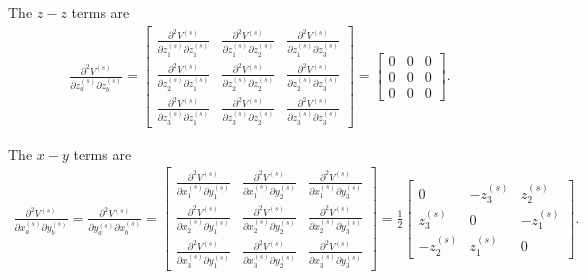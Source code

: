 The $z-z$ terms are
%
\begin{eqnarray}
\frac{\partial^2V^{(s)}}{\partial z_a^{(s)} \partial z_b^{(s)}} = 
\begin{bmatrix}
\frac{\partial^2V^{(s)}}{\partial z_1^{(s)} \partial z_1^{(s)}} & \frac{\partial^2V^{(s)}}{\partial z_1^{(s)} \partial z_2^{(s)}}  & \frac{\partial^2V^{(s)}}{\partial z_1^{(s)} \partial z_3^{(s)}} \\
%
\frac{\partial^2V^{(s)}}{\partial z_2^{(s)} \partial z_1^{(s)}} & \frac{\partial^2V^{(s)}}{\partial z_2^{(s)} \partial z_2^{(s)}}  & \frac{\partial^2V^{(s)}}{\partial z_2^{(s)} \partial z_3^{(s)}} \\
%
\frac{\partial^2V^{(s)}}{\partial z_3^{(s)} \partial z_1^{(s)}} & \frac{\partial^2V^{(s)}}{\partial z_3^{(s)} \partial z_2^{(s)}}  & \frac{\partial^2V^{(s)}}{\partial z_3^{(s)} \partial z_3^{(s)}}
\end{bmatrix} =
\begin{bmatrix}
0 & 0 & 0 \\
0 & 0 & 0 \\
0 & 0 & 0
\end{bmatrix}.
\end{eqnarray}
%

The $x-y$ terms are
%
\begin{eqnarray}
\frac{\partial^2V^{(s)}}{\partial x_a^{(s)} \partial y_b^{(s)}} = \frac{\partial^2V^{(s)}}{\partial y_a^{(s)} \partial x_b^{(s)}}=
\begin{bmatrix}
\frac{\partial^2V^{(s)}}{\partial x_1^{(s)} \partial y_1^{(s)}} & \frac{\partial^2V^{(s)}}{\partial x_1^{(s)} \partial y_2^{(s)}}  & \frac{\partial^2V^{(s)}}{\partial x_1^{(s)} \partial y_3^{(s)}} \\
%
\frac{\partial^2V^{(s)}}{\partial x_2^{(s)} \partial y_1^{(s)}} & \frac{\partial^2V^{(s)}}{\partial x_2^{(s)} \partial y_2^{(s)}}  & \frac{\partial^2V^{(s)}}{\partial x_2^{(s)} \partial y_3^{(s)}} \\
%
\frac{\partial^2V^{(s)}}{\partial x_3^{(s)} \partial y_1^{(s)}} & \frac{\partial^2V^{(s)}}{\partial x_3^{(s)} \partial y_2^{(s)}}  & \frac{\partial^2V^{(s)}}{\partial x_3^{(s)} \partial y_3^{(s)}}
\end{bmatrix} =
\frac{1}{2}
\begin{bmatrix}
0 & -z_3^{(s)} & z_2^{(s)} \\
z_3^{(s)} & 0 & -z_1^{(s)} \\
-z_2^{(s)} & z_1^{(s)} & 0
\end{bmatrix}.
\end{eqnarray}
%

